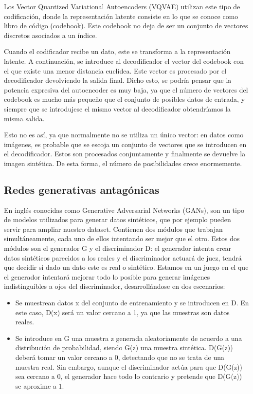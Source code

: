 Los Vector Quantized Variational Autoencoders (VQVAE) utilizan este tipo de codificación, donde la representación latente consiste en lo que se conoce como libro de código (codebook). Este codebook no deja de ser un conjunto de vectores discretos asociados a un índice.

Cuando el codificador recibe un dato, este se transforma a la representación latente. A continuación, se introduce al decodificador el vector del codebook con el que existe una menor distancia euclídea. Este vector es procesado por el decodificador devolviendo la salida final. Dicho esto, se podría pensar que la potencia expresiva del autoencoder es muy baja, ya que el número de vectores del codebook es mucho más pequeño que el conjunto de posibles datos de entrada, y siempre que se introdujese el mismo vector al decodificador obtendríamos la misma salida.

Esto no es así, ya que normalmente no se utiliza un único vector: en datos como imágenes, es probable que se escoja un conjunto de vectores que se introducen en el decodificador. Estos son procesados conjuntamente y finalmente se devuelve la imagen sintética. De esta forma, el número de posibilidades crece enormemente. \cite{vqvae}

\subsection{Redes generativas antagónicas}
En inglés conocidas como Generative Adversarial Networks (GANs), son un tipo de modelos utilizados para generar datos sintéticos, que por ejemplo pueden servir para ampliar nuestro dataset. Contienen dos módulos que trabajan simultáneamente, cada uno de ellos intentando ser mejor que el otro. Estos dos módulos son el generador G y el discriminador D: el generador intenta crear datos sintéticos parecidos a los reales y el discriminador actuará de juez, tendrá que decidir si dado un dato este es real o sintético.
Estamos en un juego en el que el generador intentará mejorar todo lo posible para generar imágenes indistinguibles a ojos del discriminador, desarrollándose en dos escenarios: \cite{berzal2018redes}

\begin{itemize}
    \item Se muestrean datos x del conjunto de entrenamiento y se introducen en D. En este caso, D(x) será un valor cercano a 1, ya que las muestras son datos reales.
    \item Se introduce en G una muestra z generada aleatoriamente de acuerdo a una distribución de probabilidad, siendo G(z) una muestra sintética. D(G(z)) deberá tomar un valor cercano a 0, detectando que no se trata de una muestra real. Sin embargo, aunque el discriminador actúa para que D(G(z)) sea cercano a 0, el generador hace todo lo contrario y pretende que D(G(z)) se aproxime a 1.
\end{itemize}

